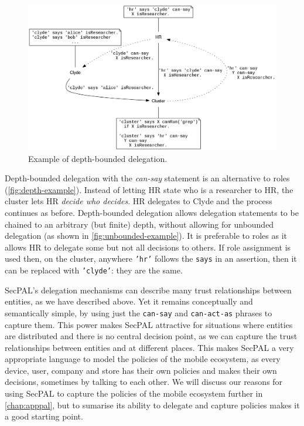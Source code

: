 \documentclass[thesis.tex]{subfiles}
\begin{document}
\begin{figure}
  \centering
  \includegraphics[width=\textwidth]{figures/secpal-example-delegation2.png}
  \caption{Example of depth-bounded delegation.}
  \label{fig:depth-example}
\end{figure}

Depth-bounded delegation with the \emph{can-say} statement is an alternative to
roles (\autoref{fig:depth-example}). Instead of letting HR state who is a
researcher to HR, the cluster lets HR \emph{decide who decides}. HR delegates to
Clyde and the process continues as before. Depth-bounded delegation allows
delegation statements to be chained to an arbitrary (but finite) depth, without
allowing for unbounded delegation (as shown in \autoref{fig:unbounded-example}). It is preferable to roles as it allows HR to
delegate some but not all decisions to others. If role assignment is used then,
on the cluster, anywhere \texttt{'hr'} follows the \texttt{says} in an
assertion, then it can be replaced with \texttt{'clyde'}: they are the same.

SecPAL's delegation mechanisms can describe many trust relationships
between entities, as we have described above. Yet it remains
conceptually and semantically simple, by using just the \texttt{can-say} and \texttt{can-act-as} phrases to capture them. This power makes SecPAL
attractive for situations where entities are distributed and there is
no central decision point, as we can capture the trust relationships
between entities and at different places. This makes SecPAL a very
appropriate language to model the policies of the mobile ecosystem, as
every device, user, company and store has their own policies and makes
their own decisions, sometimes by talking to each other. We will
discuss our reasons for using SecPAL to capture the policies of the
mobile ecosystem further in \autoref{chap:apppal}, but to sumarise its
ability to delegate and capture policies makes it a good starting
point.
\end{document}
